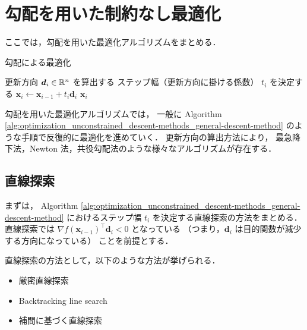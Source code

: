 %

\chapter{勾配を用いた制約なし最適化}
\label{chap:optimization_unconstrained_descent-methods}

ここでは，勾配を用いた最適化アルゴリズムをまとめる．

\begin{algorithm}[tp]
    \caption{勾配による最適化}
    \label{alg:optimization_unconstrained_descent-methods_general-descent-method}
    \begin{algorithmic}[1]
        \State 更新方向 $\bm{d}_i \in \mathbb{R}^n$ を算出する
        \State ステップ幅（更新方向に掛ける係数） $t_i$ を決定する
        \State $\bm{x}_i \gets \bm{x}_{i-1} + t_i \bm{d}_i$
        \State \Return $\bm{x}_i$
        \EndIf
        \EndFor
        \EndProcedure
    \end{algorithmic}
\end{algorithm}

勾配を用いた最適化アルゴリズムでは，
一般に
Algorithm \ref{alg:optimization_unconstrained_descent-methods_general-descent-method}
のような手順で反復的に最適化を進めていく．
更新方向の算出方法により，
最急降下法，Newton 法，共役勾配法のような様々なアルゴリズムが存在する．

\section{直線探索}
\label{sec:optimization_unconstrained_descent-methods_line-search}

まずは，
Algorithm \ref{alg:optimization_unconstrained_descent-methods_general-descent-method}
におけるステップ幅 $t_i$ を決定する直線探索の方法をまとめる．
直線探索では
$\nabla f(\bm{x}_{i-1})^\top \bm{d}_i < 0$ となっている
（つまり，$\bm{d}_i$ は目的関数が減少する方向になっている）
ことを前提とする．

直線探索の方法として，以下のような方法が挙げられる．

\begin{itemize}
    \item 厳密直線探索
    \item Backtracking line search \cite[Section 9.2]{Boyd2004}
    \item 補間に基づく直線探索 \cite[Section 9.7.1]{Press2007}
\end{itemize}

